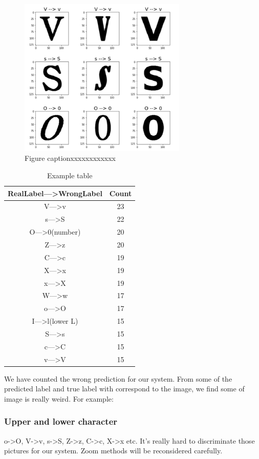 \documentclass[twoside,twocolumn,10.8pt]{article}
\begin{document}
\begin{figure}[h]
\includegraphics[width=8cm]{wront_pic_ana.png}
\centering
\caption{Figure captionxxxxxxxxxxxx}\label{fig3}
\end{figure}

\begin{table}[h]
\caption{Example table}
\centering
\begin{tabular}{c|c}
\hline
RealLabel—>WrongLabel & Count\\
\hline
V—>v & 23 \\
s—>S & 22 \\
O—>0(number) & 20 \\
Z—>z & 20 \\
C—>c & 19 \\
X—>x & 19 \\
x—>X & 19 \\
W—>w & 17 \\
o—>O & 17 \\
I—>l(lower L) & 15 \\
S—>s & 15 \\
c—>C & 15 \\
v—>V & 15 \\
\hline
\end{tabular}
\end{table}

\noindent We have counted the wrong prediction for our system. From some of the predicted label and true label with correspond to the image, we find some of image is really weird. For example:

\subsubsection{Upper and lower character}

o->O, V->v, s->S, Z->z, C->c, X->x etc. It's really hard to discriminate those pictures for our system. Zoom methods will be reconsidered carefully. 
\end{document}
